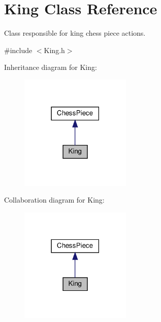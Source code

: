 \hypertarget{classKing}{}\section{King Class Reference}
\label{classKing}


Class responsible for king chess piece actions.  




{\ttfamily \#include $<$King.\+h$>$}



Inheritance diagram for King\+:\nopagebreak
\begin{figure}[H]
\begin{center}
\leavevmode
\includegraphics[width=150pt]{classKing__inherit__graph}
\end{center}
\end{figure}


Collaboration diagram for King\+:\nopagebreak
\begin{figure}[H]
\begin{center}
\leavevmode
\includegraphics[width=150pt]{classKing__coll__graph}
\end{center}
\end{figure}
